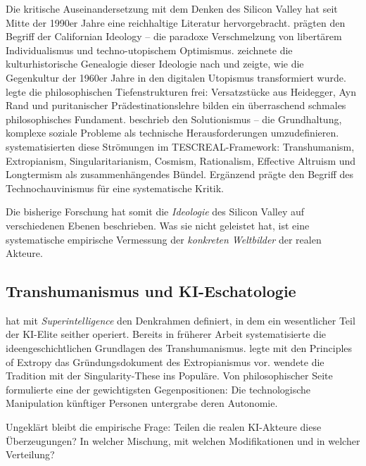 \documentclass[12pt,a4paper]{article}
\begin{document}
Die kritische Auseinandersetzung mit dem Denken des Silicon Valley hat seit Mitte der 1990er Jahre eine reichhaltige Literatur hervorgebracht. \citet{BarbCam1996} pr\"agten den Begriff der \glqq Californian Ideology\grqq{} -- die paradoxe Verschmelzung von libert\"arem Individualismus und techno-utopischem Optimismus. \citet{Turner2006} zeichnete die kulturhistorische Genealogie dieser Ideologie nach und zeigte, wie die Gegenkultur der 1960er Jahre in den digitalen Utopismus transformiert wurde. \citet{Daub2020} legte die philosophischen Tiefenstrukturen frei: Versatzst\"ucke aus Heidegger, Ayn Rand und puritanischer Pr\"adestinationslehre bilden ein \glqq \"uberraschend schmales philosophisches Fundament\grqq. \citet{Morozov2013} beschrieb den Solutionismus -- die Grundhaltung, komplexe soziale Probleme als technische Herausforderungen umzudefinieren. \citet{TorresGebru2024} systematisierten diese Str\"omungen im TESCREAL-Framework: Transhumanism, Extropianism, Singularitarianism, Cosmism, Rationalism, Effective Altruism und Longtermism als \glqq zusammenh\"angendes B\"undel\grqq. Erg\"anzend pr\"agte \citet{Broussard2018} den Begriff des \glqq Technochauvinismus\grqq{} f\"ur eine systematische Kritik.

Die bisherige Forschung hat somit die \emph{Ideologie} des Silicon Valley auf verschiedenen Ebenen beschrieben. Was sie nicht geleistet hat, ist eine systematische empirische Vermessung der \emph{konkreten Weltbilder} der realen Akteure.


\subsection{Transhumanismus und KI-Eschatologie}
\label{sec:forschungsstand:transhumanismus}

\citet{Bostrom2014} hat mit \emph{Superintelligence} den Denkrahmen definiert, in dem ein wesentlicher Teil der KI-Elite seither operiert. Bereits in fr\"uherer Arbeit systematisierte \citet{Bostrom2005} die ideengeschichtlichen Grundlagen des Transhumanismus. \citet{More2003} legte mit den \glqq Principles of Extropy\grqq{} das Gr\"undungsdokument des Extropianismus vor. \citet{Kurzweil2005} wendete die Tradition mit der Singularity-These ins Popul\"are. Von philosophischer Seite formulierte \citet{Habermas2001} eine der gewichtigsten Gegenpositionen: Die technologische Manipulation k\"unftiger Personen untergrabe deren Autonomie.

Ungekl\"art bleibt die empirische Frage: Teilen die realen KI-Akteure diese \"Uberzeugungen? In welcher Mischung, mit welchen Modifikationen und in welcher Verteilung?
\end{document}
